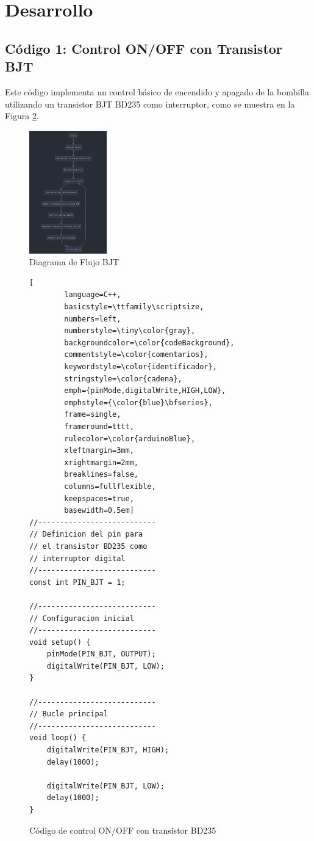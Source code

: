 \section{Desarrollo}
\subsection{C\'odigo 1: Control ON/OFF con Transistor BJT}
Este c\'odigo implementa un control b\'asico de encendido y apagado de la bombilla utilizando un transistor BJT BD235 como interruptor, como se muestra en la Figura \ref{fig:codigo-bjt}.
\begin{figure}[H]
	\centering
	\includegraphics[width=0.3\textwidth]{images/dbjt}
	\caption{Diagrama de Flujo BJT}
	\label{fig:flujobjt}
\end{figure}

\begin{figure}[H]
	\centering
	\begin{lstlisting}[
		language=C++,
		basicstyle=\ttfamily\scriptsize,
		numbers=left,
		numberstyle=\tiny\color{gray},
		backgroundcolor=\color{codeBackground},
		commentstyle=\color{comentarios},
		keywordstyle=\color{identificador},
		stringstyle=\color{cadena},
		emph={pinMode,digitalWrite,HIGH,LOW},
		emphstyle={\color{blue}\bfseries},
		frame=single,
		frameround=tttt,
		rulecolor=\color{arduinoBlue},
		xleftmargin=3mm,
		xrightmargin=2mm,
		breaklines=false,
		columns=fullflexible,
		keepspaces=true,
		basewidth=0.5em]
//---------------------------
// Definicion del pin para 
// el transistor BD235 como
// interruptor digital
//---------------------------
const int PIN_BJT = 1;    

//---------------------------
// Configuracion inicial
//---------------------------
void setup() {
	pinMode(PIN_BJT, OUTPUT);
	digitalWrite(PIN_BJT, LOW);
}

//---------------------------
// Bucle principal
//---------------------------
void loop() {
	digitalWrite(PIN_BJT, HIGH);
	delay(1000);  
	
	digitalWrite(PIN_BJT, LOW);
	delay(1000);  
}
	\end{lstlisting}
	\caption{C\'odigo de control ON/OFF con transistor BD235}
	\label{fig:codigo-bjt}
\end{figure}

